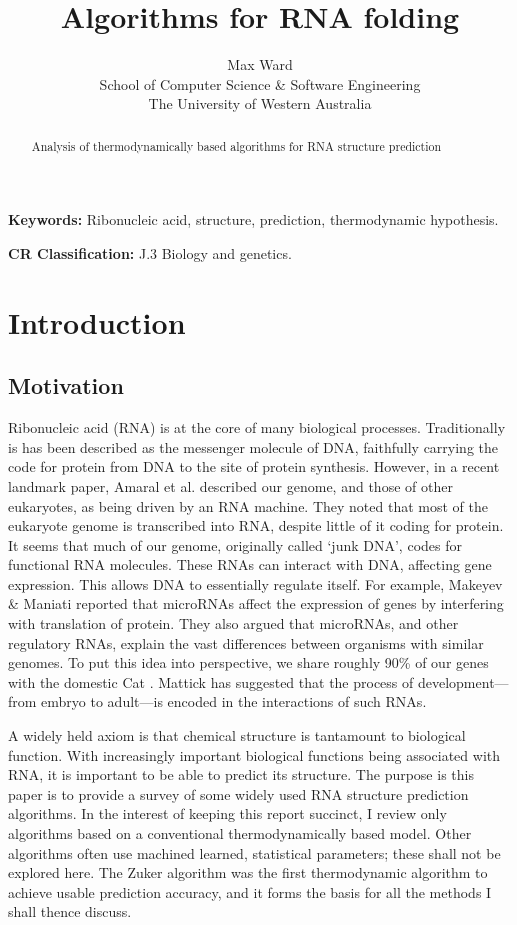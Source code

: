 \documentclass[12pt, a4paper]{article}
\title{Algorithms for RNA folding}
\author{Max Ward \\
School of Computer Science \& Software Engineering \\
The University of Western Australia}
\begin{document}
\maketitle

\begin{abstract}
Analysis of thermodynamically based algorithms for RNA structure prediction
\end{abstract}


{\bf Keywords:} Ribonucleic acid, structure, prediction, thermodynamic hypothesis.

{\bf CR Classification:} J.3 Biology and genetics.

\clearpage

\tableofcontents
\listoffigures
\clearpage

\section{Introduction}
\subsection{Motivation}
Ribonucleic acid (RNA) is at the core of many biological processes. Traditionally is has been described as the messenger molecule of DNA, faithfully carrying the code for protein from DNA to the site of protein synthesis. However, in a recent landmark paper, Amaral et al. \cite{amaral2008eukaryotic} described our genome, and those of other eukaryotes, as being driven by an RNA machine. They noted that most of the eukaryote genome is transcribed into RNA, despite little of it coding for protein. It seems that much of our genome, originally called `junk DNA', codes for functional RNA molecules. These RNAs can interact with DNA, affecting gene expression. This allows DNA to essentially regulate itself. For example, Makeyev \& Maniati \cite{makeyev2008multilevel} reported that microRNAs affect the expression of genes by interfering with translation of protein. They also argued that microRNAs, and other regulatory RNAs, explain the vast differences between organisms with similar genomes. To put this idea into perspective, we share roughly 90\% of our genes with the domestic Cat \cite{pontius2007initial}. Mattick \cite{mattick2007new} has suggested that the process of development---from embryo to adult---is encoded in the interactions of such RNAs.

A widely held axiom is that chemical structure is tantamount to biological function. With increasingly important biological functions being associated with RNA, it is important to be able to predict its structure. The purpose is this paper is to provide a survey of some widely used RNA structure prediction algorithms. In the interest of keeping this report succinct, I review only algorithms based on a conventional thermodynamically based model. Other algorithms often use machined learned, statistical parameters; these shall not be explored here. The Zuker algorithm was the first thermodynamic algorithm to achieve usable prediction accuracy, and it forms the basis for all the methods I shall thence discuss.
\end{document}
